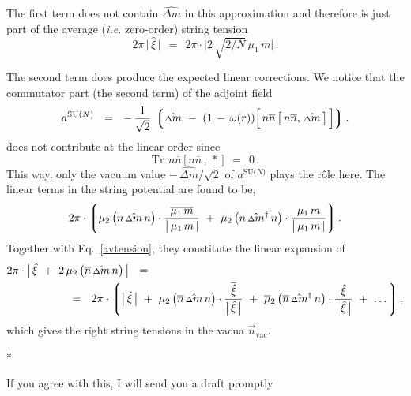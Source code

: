 \documentclass[12pt]{article}
\def\beq{\begin{equation}}
\def\eeq{\end{equation}}
\newcommand{\ov}{\overline}
\newcommand{\lgr}{\left\lgroup}
\newcommand{\rgr}{\right\rgroup}
\newcommand{\aN}{a^\text{SU($N$)}}
\newcommand{\nbar}{\ov{n}}
\newcommand{\nnbar}{n\ov{n}}
\newcommand{\Tr}{\text{Tr}}
\newcommand{\dm}{\hat{{\scriptstyle \Delta} m}}
\newcommand{\dmdag}{\hat{{\scriptstyle \Delta} m}{}^\dag}
\newcommand{\ie}{{\it i.e.} }
\begin{document}
	The first term does not contain $ \dm $ in this approximation and therefore is just
	part of the average (\ie zero-order) string tension
\beq
\label{avtension}
	2 \pi\, \big|\, \hat{\xi} \,\big|    ~~=~~    2 \pi \cdot \Big| 2\, \sqrt{2/N}\, \mu_1\, m \Big| \,.
\eeq

	The second term does produce the expected linear corrections.
	We notice that the commutator part (the second term) of the adjoint field 
\beq
	\aN    ~~=~~    
	-\, \frac{1}{\sqrt{2}}\, 
	\lgr \dm  ~-~  (1 \,-\, \omega(r)) \Big[\, \nnbar\, \big[\, \nnbar,\, \dm \,\big] \,\Big] \rgr.
\eeq
	does not contribute at the linear order since
\[
	\Tr~\, \nnbar \, \big[\, \nnbar \,,\, * \,\big]    ~~=~~    0\,.
\]
	This way, only the vacuum value $ -\, \dm/\sqrt{2} $ of $ \aN $ plays the r\^ole here.
	The linear terms in the string potential are found to be,
\beq
	2\pi \cdot 
	\lgr
		\mu_2\, \big(\nbar\, \dm\, n\big) \cdot \frac{\ov{\mu_1\, m}}{\big|\, \mu_1\, m \,|}
		~+~
		\ov{\mu}{}_2\, \big(\nbar\, \dmdag\, n\big) \cdot \frac{\mu_1\, m}{\big|\, \mu_1\, m \,|}
	\rgr.
\eeq
	Together with Eq.~\eqref{avtension}, they constitute the linear expansion of 
\begin{align}
%
\notag
	&
	2 \pi \cdot \big|\, \hat{\xi}  ~+~  2\, \mu_2\, \big(\nbar\, \dm\, n\big) \,\big|    ~~=~~  
	\\
%
\notag
	&
	\qquad\qquad\quad
	~~=~~
	2\pi \cdot
	\lgr
		\big|\, \hat{\xi} \,\big|
		~+~
		\mu_2\, \big(\nbar\, \dm\, n\big) \cdot \frac{\ov{\hat{\xi}}}{\big|\, \hat{\xi} \,\big|}
		~+~
		\ov{\mu}{}_2\, \big(\nbar\, \dmdag\, n\big) \cdot \frac{\hat{\xi}}{\big|\, \hat{\xi} \,\big|}
		~+~
		\dots
	\rgr,
\end{align}
	which gives the right string tensions in the vacua $ \vec{n}{}_\text{vac} $.


\vspace{0.8cm}
\centerline{*\qquad\qquad\qquad*\qquad\qquad\qquad*}
\vspace{0.8cm}


	If you agree with this, I will send you a draft promptly
\end{document}
